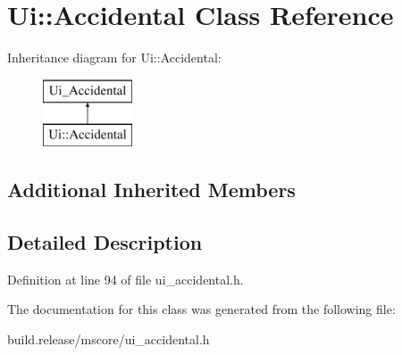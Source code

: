 \hypertarget{class_ui_1_1_accidental}{}\section{Ui\+:\+:Accidental Class Reference}
\label{class_ui_1_1_accidental}
Inheritance diagram for Ui\+:\+:Accidental\+:\begin{figure}[H]
\begin{center}
\leavevmode
\includegraphics[height=2.000000cm]{class_ui_1_1_accidental}
\end{center}
\end{figure}
\subsection*{Additional Inherited Members}


\subsection{Detailed Description}


Definition at line 94 of file ui\+\_\+accidental.\+h.



The documentation for this class was generated from the following file\+:\begin{DoxyCompactItemize}
\item 
build.\+release/mscore/ui\+\_\+accidental.\+h\end{DoxyCompactItemize}
